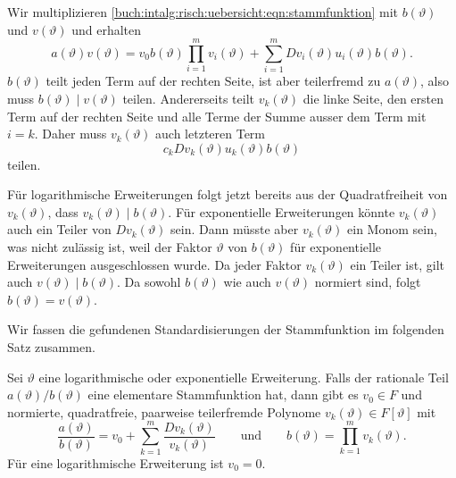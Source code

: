 Wir multiplizieren \eqref{buch:intalg:risch:uebersicht:eqn:stammfunktion}
mit $b(\vartheta)$ und $v(\vartheta)$ und erhalten
\[
a(\vartheta) v(\vartheta)
=
v_0 b(\vartheta) \prod_{i=1}^m v_i(\vartheta)
+
\sum_{i=1}^m Dv_i(\vartheta) u_i(\vartheta) b(\vartheta).
\]
$b(\vartheta)$ teilt jeden Term auf der rechten Seite, ist aber teilerfremd
zu $a(\vartheta)$, also muss $b(\vartheta)\mid v(\vartheta)$ teilen.
Andererseits teilt $v_k(\vartheta)$ die linke Seite, den ersten Term
auf der rechten Seite und alle Terme der Summe ausser dem Term mit $i=k$.
Daher muss $v_k(\vartheta)$ auch letzteren Term
\[
c_k Dv_k(\vartheta) u_k(\vartheta) b(\vartheta)
\]
teilen.

Für logarithmische Erweiterungen folgt jetzt bereits aus der Quadratfreiheit
von $v_k(\vartheta)$, dass $v_k(\vartheta) \mid b(\vartheta)$.
Für exponentielle Erweiterungen könnte $v_k(\vartheta)$ auch ein
Teiler von $Dv_k(\vartheta)$ sein.
Dann müsste aber $v_k(\vartheta)$ ein Monom sein, was nicht zulässig
ist, weil der Faktor $\vartheta$ von $b(\vartheta)$ für exponentielle
Erweiterungen ausgeschlossen wurde.
Da jeder Faktor $v_k(\vartheta)$ ein Teiler ist, gilt auch
$v(\vartheta)\mid b(\vartheta)$.
Da sowohl $b(\vartheta)$ wie auch $v(\vartheta)$ normiert sind, folgt
$b(\vartheta) = v(\vartheta)$.

Wir fassen die gefundenen Standardisierungen der Stammfunktion im folgenden
Satz zusammen.

\begin{satz}[Standardform]
\label{buch:intalg:risch:satz:standardform}
%
Sei $\vartheta$ eine logarithmische oder exponentielle Erweiterung.
Falls der rationale Teil $a(\vartheta)/b(\vartheta)$ eine elementare
Stammfunktion hat, dann gibt es $v_0\in F$ und normierte, quadratfreie,
paarweise teilerfremde Polynome $v_k(\vartheta)\in F[\vartheta]$ mit
\begin{equation}
\frac{a(\vartheta)}{b(\vartheta)}
=
v_0 + \sum_{k=1}^m \frac{Dv_k(\vartheta)}{v_k(\vartheta)}
\qquad\text{und}\qquad
b(\vartheta)
=
\prod_{k=1}^m v_k(\vartheta).
\label{buch:intalg:risch:satz:eqn:standardform}
\end{equation}
Für eine logarithmische Erweiterung ist $v_0=0$.
\end{satz}

%
%
